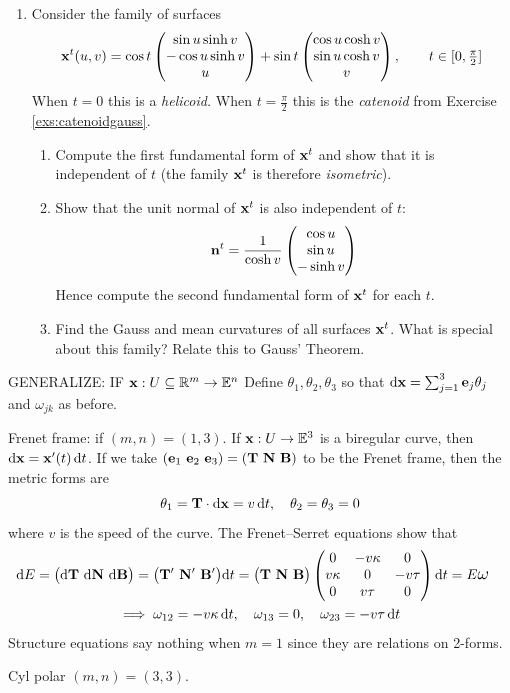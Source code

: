 \begin{exercises}{}{}
\begin{enumerate}
  
  	\item Consider the family of surfaces
  	\[
  		{\mathbf{x}}^t(u,v)=\cos t\begin{pmatrix}\sin u\sinh v\\-\cos u\sinh v\\u\end{pmatrix}+ \sin t\begin{pmatrix}\cos u\cosh v\\\sin u\cosh v\\v\end{pmatrix},\qquad t\in[0,\tfrac\pi 2]
  	\]
   	When $t=0$ this is a \emph{helicoid.} When $t=\frac\pi 2$ this is the \emph{catenoid} from Exercise \ref{exs:catenoidgauss}.
		\begin{enumerate}
  		\item Compute the first fundamental form of ${\mathbf{x}}^t$ and show that it is independent of $t$ (the family ${\mathbf{x}}^t$ is therefore \emph{isometric}). 
  		\item Show that the unit normal of ${\mathbf{x}}^t$ is also independent of $t$:
 	 		\[
 	 			{\mathbf{n}}^t=\frac 1{\cosh v}\begin{pmatrix}\cos u\\\sin u\\-\sinh v\end{pmatrix}
 	 		\]
  		Hence compute the second fundamental form of ${\mathbf{x}}^t$ for each $t$.
  		\item Find the Gauss and mean curvatures of all surfaces ${\mathbf{x}}^t$. What is special about this family? Relate this to Gauss' Theorem.
		\end{enumerate}

	\end{enumerate}
\end{exercises}

\iffalse
\clearpage

GENERALIZE: IF ${\mathbf{x}}:U\subseteq\mathbb{R}^m\to\mathbb{E}^n$ Define $\theta_1,\theta_2,\theta_3$ so that $\mathrm{d}{\mathbf{x}}=\sum_{j=1}^3{\mathbf{e}}_j\theta_j$ and $\omega_{jk}$ as before.

\begin{examples}{}{}
Frenet frame: if $(m,n)=(1,3)$. If ${\mathbf{x}}:U\to\mathbb{E}^3$ is a biregular curve, then $\mathrm{d}{\mathbf{x}}={\mathbf{x}}'(t)\,{\mathrm{d} t}$. If we take $({\mathbf{e}}_1\ {\mathbf{e}}_2\ {\mathbf{e}}_3)=({\mathbf{T}}\ {\mathbf{N}}\ {\mathbf{B}})$ to be the Frenet frame, then the metric forms are
	\[\theta_1={\mathbf{T}}\cdot\mathrm{d}{\mathbf{x}}=v\,{\mathrm{d} t},\quad \theta_2=\theta_3=0\]
	where $v$ is the speed of the curve. The Frenet--Serret equations show that
	\begin{gather*}
	\begin{aligned}
	\D E&=\bigl(\D\vT\ \D\vN\ \D\vB\bigr)=\bigl(\vT'\ \vN'\ \vB'\bigr)\dt =\bigl(\vT\ \vN\ \vB\bigr)
	\begin{pmatrix}
		0&-v\kappa&0\\
		v\kappa&0&-v\tau\\
		0&v\tau&0
	\end{pmatrix}\dt =E\lomega
	\end{aligned}
	\\
	\implies \omega_{12}=-v\kappa\,\dt,\quad \omega_{13}=0,\quad \omega_{23}=-v\tau\,\dt
	\end{gather*}
	Structure equations say nothing when $m=1$ since they are relations on 2-forms.

Cyl polar $(m,n)=(3,3)$. 
\end{examples}

